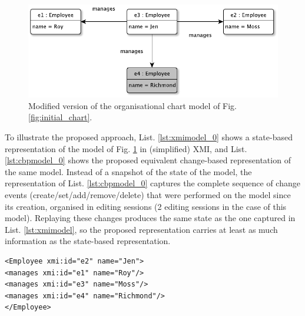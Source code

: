 \documentclass[12pt, a4paper]{report} \usepackage[titletoc]{appendix}
\begin{document}
\begin{figure}[ht]
	\centering
	\includegraphics[width=\linewidth]{modified_chart}
	\caption{Modified version of the organisational chart model of Fig. \ref{fig:initial_chart}.}
	\label{fig:modified_chart}
\end{figure}

To illustrate the proposed approach, List. \ref{lst:xmimodel_0} shows a state-based representation of the model of Fig. \ref{fig:modified_chart} in (simplified) XMI, and List. \ref{lst:cbpmodel_0} shows the proposed equivalent change-based representation of the same model. Instead of a snapshot of the state of the model, the representation of List. \ref{lst:cbpmodel_0} captures the complete sequence of change events (create/set/add/remove/delete) that were performed on the model since its creation, organised in editing sessions (2 editing sessions in the case of this model). Replaying these changes produces the same state as the one captured in List. \ref{lst:xmimodel}, so the proposed representation carries at least as much information as the state-based representation.

\begin{lstlisting}[style=xmi,caption={State-based representation of the model of Figure \ref{fig:modified_chart} in (simplified) XMI.},label=lst:xmimodel_0]
<Employee xmi:id="e2" name="Jen">
<manages xmi:id="e1" name="Roy"/>
<manages xmi:id="e3" name="Moss"/>
<manages xmi:id="e4" name="Richmond"/>
</Employee>
\end{lstlisting}
\end{document}
